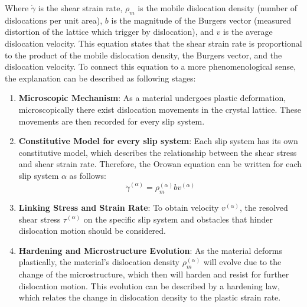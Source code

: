 \documentclass[12pt]{article}
\begin{document}
\hspace{2em}Where $\dot{\gamma}$ is the shear strain rate, $\rho_m$ is the mobile dislocation density (number
of dislocations per unit area), 
$b$ is the magnitude of the Burgers vector (measured distortion of the lattice which trigger by dislocation), 
and $v$ is the average dislocation velocity. 
This equation states that the shear strain rate is proportional to the 
product of the mobile dislocation density, the Burgers vector, and the dislocation velocity. To connect this equation
to a more phenomenological sense, the explanation can be described as following stages:
\begin{enumerate}
    \item \textbf{Microscopic Mechanism}: As a material undergoes plastic deformation, microscopically there 
    exist dislocation movements in the crystal lattice. These movements are then recorded for every slip system.
    \item \textbf{Constitutive Model for every slip system}: Each slip system has its own constitutive model, 
    which describes the relationship between the shear stress and shear strain rate. Therefore, the Orowan equation can be written
    for each slip system $\alpha$ as follows:
    \begin{equation}
        \dot{\gamma}^{(\alpha)} = \rho_m^{(\alpha)} b v^{(\alpha)}
    \end{equation}
    \item \textbf{Linking Stress and Strain Rate}: To obtain velocity $v^{(\alpha)}$, 
    the resolved shear stress $\tau^{(\alpha)}$ on the specific slip system and obstacles that hinder
    dislocation motion should be considered. 
    \item \textbf{Hardening and Microstructure Evolution}: As the material deforms plastically, the material's
    dislocation density $\rho_m^{(\alpha)}$ will evolve due to the change of the microstructure, which then will harden and resist for 
    further dislocation motion. This evolution can be described by a hardening law, which relates
    the change in dislocation density to the plastic strain rate.
\end{enumerate}
\end{document}
